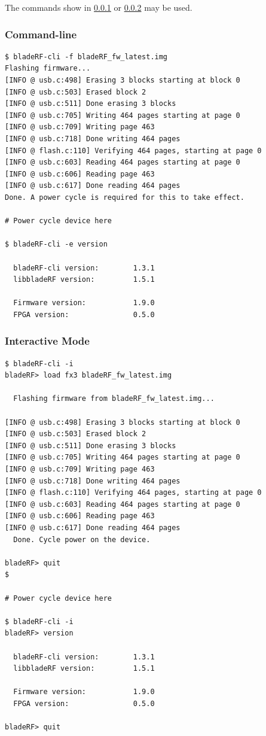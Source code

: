 The commands show in \ref{sec:fw-upgrade-cli} or \ref{sec:fw-upgrade-interactive}
may be used.

\newpage
\subsubsection{Command-line} \label{sec:fw-upgrade-cli}
\begin{lstlisting}[style=cmdline]
$ bladeRF-cli -f bladeRF_fw_latest.img
Flashing firmware...
[INFO @ usb.c:498] Erasing 3 blocks starting at block 0
[INFO @ usb.c:503] Erased block 2
[INFO @ usb.c:511] Done erasing 3 blocks
[INFO @ usb.c:705] Writing 464 pages starting at page 0
[INFO @ usb.c:709] Writing page 463
[INFO @ usb.c:718] Done writing 464 pages
[INFO @ flash.c:110] Verifying 464 pages, starting at page 0
[INFO @ usb.c:603] Reading 464 pages starting at page 0
[INFO @ usb.c:606] Reading page 463
[INFO @ usb.c:617] Done reading 464 pages
Done. A power cycle is required for this to take effect.

# Power cycle device here

$ bladeRF-cli -e version

  bladeRF-cli version:        1.3.1
  libbladeRF version:         1.5.1

  Firmware version:           1.9.0
  FPGA version:               0.5.0
\end{lstlisting}

\subsubsection{Interactive Mode} \label{sec:fw-upgrade-interactive}
\begin{lstlisting}[style=cmdline]
$ bladeRF-cli -i
bladeRF> load fx3 bladeRF_fw_latest.img

  Flashing firmware from bladeRF_fw_latest.img...

[INFO @ usb.c:498] Erasing 3 blocks starting at block 0
[INFO @ usb.c:503] Erased block 2
[INFO @ usb.c:511] Done erasing 3 blocks
[INFO @ usb.c:705] Writing 464 pages starting at page 0
[INFO @ usb.c:709] Writing page 463
[INFO @ usb.c:718] Done writing 464 pages
[INFO @ flash.c:110] Verifying 464 pages, starting at page 0
[INFO @ usb.c:603] Reading 464 pages starting at page 0
[INFO @ usb.c:606] Reading page 463
[INFO @ usb.c:617] Done reading 464 pages
  Done. Cycle power on the device.

bladeRF> quit
$

# Power cycle device here

$ bladeRF-cli -i
bladeRF> version

  bladeRF-cli version:        1.3.1
  libbladeRF version:         1.5.1

  Firmware version:           1.9.0
  FPGA version:               0.5.0

bladeRF> quit
\end{lstlisting}

